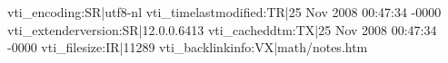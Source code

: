 vti_encoding:SR|utf8-nl
vti_timelastmodified:TR|25 Nov 2008 00:47:34 -0000
vti_extenderversion:SR|12.0.0.6413
vti_cacheddtm:TX|25 Nov 2008 00:47:34 -0000
vti_filesize:IR|11289
vti_backlinkinfo:VX|math/notes.htm
